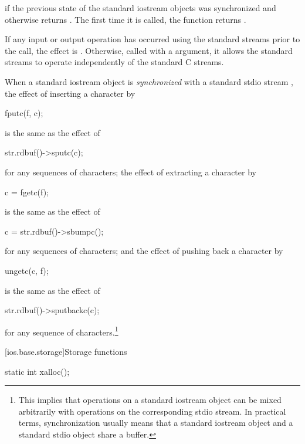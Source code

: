 \begin{itemdescr}
\pnum
\returns
{}
if the previous state of the standard iostream objects
was synchronized and otherwise returns
.
The first time it is called,
the function returns
.

\pnum
\effects
If any input or output operation has occurred using the standard streams prior to the
call, the effect is
.
Otherwise, called with a  argument, it allows the standard streams to
operate independently of the standard C streams.

\pnum
When a standard iostream object  is
\textit{synchronized}
with a standard stdio stream , the effect of inserting a character  by
\begin{codeblock}
fputc(f, c);
\end{codeblock}
is the same as the effect of
\begin{codeblock}
str.rdbuf()->sputc(c);
\end{codeblock}
for any sequences of characters; the effect of extracting a character  by
\begin{codeblock}
c = fgetc(f);
\end{codeblock}
is the same as the effect of
\begin{codeblock}
c = str.rdbuf()->sbumpc();
\end{codeblock}
for any sequences of characters; and the effect of pushing back a character  by
\begin{codeblock}
ungetc(c, f);
\end{codeblock}
is the same as the effect of
\begin{codeblock}
str.rdbuf()->sputbackc(c);
\end{codeblock}
for any sequence of characters.\footnote{This implies that operations on a standard iostream object can be mixed arbitrarily
with operations on the corresponding stdio stream. In practical terms, synchronization
usually means that a standard iostream object and a standard stdio object share a
buffer.
}
\end{itemdescr}

[ios.base.storage]{Storage functions}

%
\begin{itemdecl}
static int xalloc();
\end{itemdecl}

